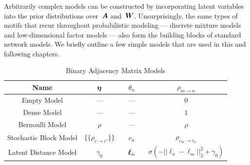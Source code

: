 Arbitrarily complex models can be constructed by incorporating latent
variables into the prior distributions over~$\boldsymbol{A}$ and~$\boldsymbol{W}$.
Unsurprisingly, the same types of motifs that recur throughout
probabilistic modeling --- discrete mixture models and low-dimensional
factor models --- also form the building blocks of
standard network models.  We briefly outline a few simple models that
are used in this and following chapters.


\begin{table}
\begin{center}
\begin{tabular}{c|c|c|c}
Name & $\boldsymbol{\eta}$ & $\quad\theta_n\quad$ & $\rho_{m \to n}$ \\
\hline
Empty Model & --- &  --- & $0$ \\
Dense Model & --- & --- & $1$ \\
Bernoulli Model & $\rho$ & --- & $\rho$ \\
Stochastic Block Model & $\{\{\rho_{c \to c'}\}\}$ & $c_n$ & $\rho_{c_m \to c_n}$ \\
Latent Distance Model & $\gamma_0$ & $\boldsymbol{\ell}_n$ & $\sigma(-||\ell_n - \ell_m||_2^2 + \gamma_0)$
\end{tabular}
\end{center}
\caption{Binary Adjacency Matrix Models}
\label{tab:A_models}
\end{table}

